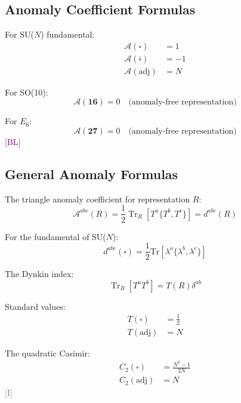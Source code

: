 \documentclass[11pt,a4paper]{article}
\newcommand{\tagI}{\textcolor{gray}{[I]}}
\newcommand{\tagBL}{\textcolor{purple}{[BL]}}
\DeclareMathOperator{\Tr}{Tr}
\begin{document}
\subsection{Anomaly Coefficient Formulas}

For SU($N$) fundamental:
\begin{align}
\label{eq:anomaly-fund}
\mathcal{A}(\square) &= 1 \\
\label{eq:anomaly-antifund}
\mathcal{A}(\bar{\square}) &= -1 \\
\label{eq:anomaly-adj}
\mathcal{A}(\text{adj}) &= N
\end{align}

For SO(10):
\begin{equation}
\label{eq:so10-16-anomaly}
\mathcal{A}(\mathbf{16}) = 0 \quad \text{(anomaly-free representation)}
\end{equation}

For $E_6$:
\begin{equation}
\label{eq:e6-27-anomaly-app}
\mathcal{A}(\mathbf{27}) = 0 \quad \text{(anomaly-free representation)}
\end{equation}
\tagBL

\subsection{General Anomaly Formulas}

The triangle anomaly coefficient for representation $R$:
\begin{equation}
\label{eq:triangle-general}
\mathcal{A}^{abc}(R) = \frac{1}{2} \Tr_R[T^a \{T^b, T^c\}] = d^{abc}(R)
\end{equation}

For the fundamental of SU($N$):
\begin{equation}
\label{eq:dabc-fund}
d^{abc}(\square) = \frac{1}{2} \text{Tr}[\lambda^a \{\lambda^b, \lambda^c\}]
\end{equation}

The Dynkin index:
\begin{equation}
\label{eq:dynkin-def}
\Tr_R[T^a T^b] = T(R) \delta^{ab}
\end{equation}

Standard values:
\begin{align}
\label{eq:dynkin-fund}
T(\square) &= \frac{1}{2} \\
\label{eq:dynkin-adj}
T(\text{adj}) &= N
\end{align}

The quadratic Casimir:
\begin{align}
\label{eq:casimir-fund}
C_2(\square) &= \frac{N^2 - 1}{2N} \\
\label{eq:casimir-adj}
C_2(\text{adj}) &= N
\end{align}
\tagI
\end{document}
